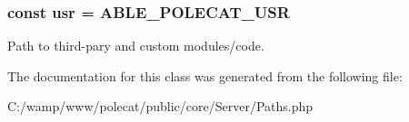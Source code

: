 \subsubsection[{usr}]{\setlength{\rightskip}{0pt plus 5cm}const usr = A\+B\+L\+E\+\_\+\+P\+O\+L\+E\+C\+A\+T\+\_\+\+U\+S\+R}\label{class_able_polecat___server___paths_acc8c23568756f209aed591b949cba229}
Path to third-\/pary and custom modules/code. 

The documentation for this class was generated from the following file\+:\begin{DoxyCompactItemize}
\item 
C\+:/wamp/www/polecat/public/core/\+Server/Paths.\+php\end{DoxyCompactItemize}
